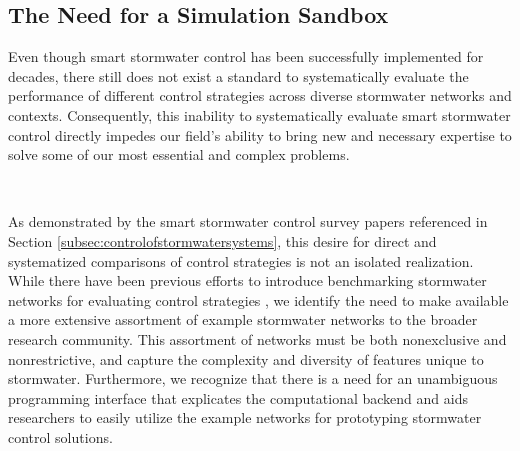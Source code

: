 \subsection{The Need for a Simulation Sandbox}
\label{subsec:overviewofthesimulationsandbox}
%
%
%
Even though smart stormwater control has been successfully implemented for decades, there still does not exist a standard to systematically evaluate the performance of different control strategies across diverse stormwater networks and contexts. Consequently, this inability to systematically evaluate smart stormwater control directly impedes our field's ability to bring new and necessary expertise to solve some of our most essential and complex problems. 

\

As demonstrated by the smart stormwater control survey papers referenced in Section \ref{subsec:controlofstormwatersystems}, this desire for direct and systematized comparisons of control strategies is not an isolated realization. While there have been previous efforts to introduce benchmarking stormwater networks for evaluating control strategies \citep{Schutze2017, Borsanyi2008}, we identify the need to make available a more extensive assortment of example stormwater networks to the broader research community. This assortment of networks must be both nonexclusive and nonrestrictive, and capture the complexity and diversity of features unique to stormwater.
Furthermore, we recognize that there is a need for an unambiguous programming interface that explicates the computational backend and aids researchers to easily utilize the example networks for prototyping stormwater control solutions. 

\

